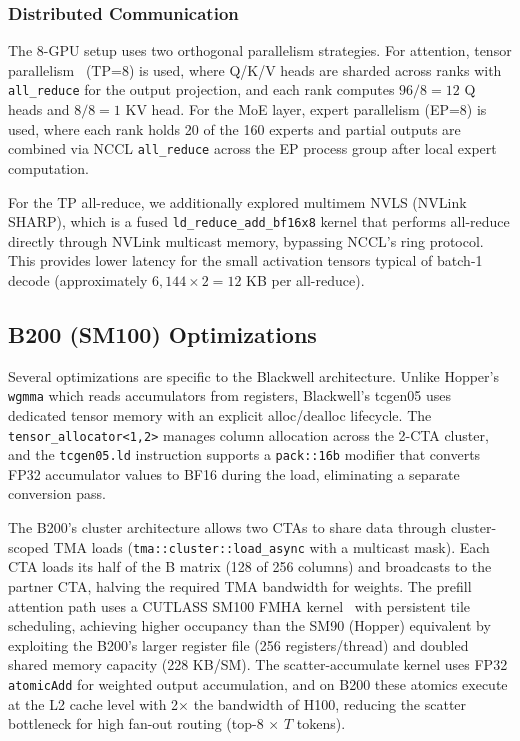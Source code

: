 \documentclass[sigplan,screen]{acmart}
\begin{document}
\subsubsection{Distributed Communication}

The 8-GPU setup uses two orthogonal parallelism strategies. For attention, tensor parallelism~\cite{megatronlm} (TP=8) is used, where Q/K/V heads are sharded across ranks with \texttt{all\_reduce} for the output projection, and each rank computes $96/8 = 12$ Q heads and $8/8 = 1$ KV head. For the MoE layer, expert parallelism (EP=8) is used, where each rank holds 20 of the 160 experts and partial outputs are combined via NCCL \texttt{all\_reduce} across the EP process group after local expert computation.

For the TP all-reduce, we additionally explored multimem NVLS (NVLink SHARP), which is a fused \texttt{ld\_reduce\_add\_bf16x8} kernel that performs all-reduce directly through NVLink multicast memory, bypassing NCCL's ring protocol. This provides lower latency for the small activation tensors typical of batch-1 decode (approximately $6{,}144 \times 2 = 12$ KB per all-reduce).

\subsection{B200 (SM100) Optimizations}
\label{sec:b200}

Several optimizations are specific to the Blackwell architecture. Unlike Hopper's \texttt{wgmma} which reads accumulators from registers, Blackwell's tcgen05 uses dedicated tensor memory with an explicit alloc/dealloc lifecycle. The \newline \texttt{tensor\_allocator<1,2>} manages column allocation across the 2-CTA cluster, and the \texttt{tcgen05.ld} instruction supports a \texttt{pack::16b} modifier that converts FP32 accumulator values to BF16 during the load, eliminating a separate conversion pass.

The B200's cluster architecture allows two CTAs to share data through cluster-scoped TMA loads \newline (\texttt{tma::cluster::load\_async} with a multicast mask). Each CTA loads its half of the B matrix (128 of 256 columns) and broadcasts to the partner CTA, halving the required TMA bandwidth for weights. The prefill attention path uses a CUTLASS SM100 FMHA kernel~\cite{flashattention} with persistent tile scheduling, achieving higher occupancy than the SM90 (Hopper) equivalent by exploiting the B200's larger register file (256 registers/thread) and doubled shared memory capacity (228 KB/SM). The scatter-accumulate kernel uses FP32 \texttt{atomicAdd} for weighted output accumulation, and on B200 these atomics execute at the L2 cache level with 2$\times$ the bandwidth of H100, reducing the scatter bottleneck for high fan-out routing (top-8 $\times$ $T$ tokens).
\end{document}
